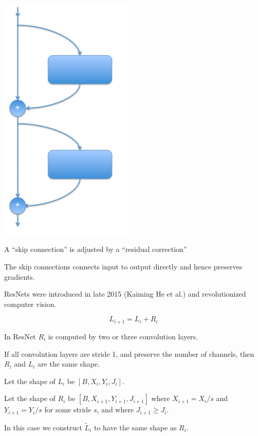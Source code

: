 {\vfill
\includegraphics[width= 2.5in]{../images/resnet}
\hfill \begin{minipage}[b]{4in}
  A ``skip connection'' is adjusted by a ``residual correction''

  \bigskip
  The skip connections connects input to output directly and hence preserves gradients.

  \bigskip
  ResNets were introduced in late 2015 (Kaiming He et al.) and revolutionized computer vision.
\end{minipage}


$$L_{i+1} = L_i + R_i$$

\vfill
In ResNet $R_i$ is computed by two or three convolution layers.

\vfill
If all convolution layers are stride 1, and preserve the number of channels, then $R_i$ and $L_i$ are the same shape.


Let the shape of $L_i$ be $[B,X_i,Y_i,J_i]$.

\vfill
Let the shape of $R_i$ be $[B,X_{i+1},Y_{i+1},J_{i+1}]$ where $X_{i+1} = X_i/s$ and $Y_{i+1} = Y_i/s$ for some stride $s$, and where $J_{i+1} \geq J_i$.

\vfill
In this case we construct $\tilde{L}_i$ to have the same shape as $R_i$.

}
